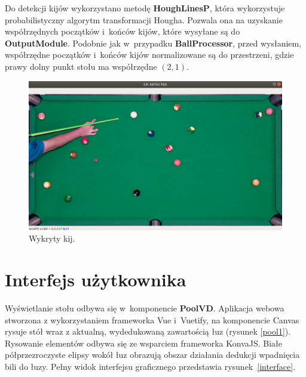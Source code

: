 \documentclass[12pt]{article}
\begin{document}
Do detekcji kijów wykorzystano metodę \textbf{HoughLinesP}\cite{HoughLinesP}, która wykorzystuje probabilistyczny algorytm transformacji Hougha\cite{ProbabilisticHoughTransform}. Pozwala ona na uzyskanie współrzędnych początków i~końców kijów, które wysyłane są do \textbf{OutputModule}. Podobnie jak w~przypadku \textbf{BallProcessor}, przed wysłaniem, współrzędne początków i~końców kijów normalizowane są do przestrzeni, gdzie prawy dolny punkt stołu ma współrzędne $(2, 1)$.

\begin{figure}[!htb]
    \centering
    \includegraphics[width=15cm]{./images/obrazki/cp/cue_detected.png}
    \caption{Wykryty kij.}
    \label{cue_detected}
\end{figure}

\FloatBarrier 

\section{Interfejs użytkownika}

Wyświetlanie stołu odbywa się w~komponencie \textbf{PoolVD}. Aplikacja webowa stworzona z wykorzystaniem frameworka Vue i~Vuetify, na komponencie Canvas rysuje stół wraz z aktualną, wydedukowaną zawartością łuz (rysunek \ref{pool1}). Rysowanie elementów odbywa się ze wsparciem frameworka KonvaJS\cite{konva}. Białe półprzezroczyste elipsy wokół łuz obrazują obszar działania dedukcji wpadnięcia bili do łuzy. Pełny widok interfejsu graficznego przedstawia rysunek~\ref{interface}.
\end{document}

